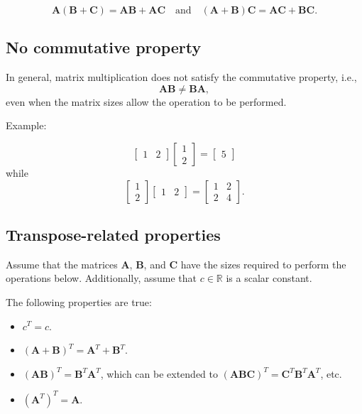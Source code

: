 \documentclass[
]{book}
\providecommand{\tightlist}{%
  \setlength{\itemsep}{0pt}\setlength{\parskip}{0pt}}
\theoremstyle{definition}
\theoremstyle{definition}
\theoremstyle{definition}
\theoremstyle{definition}
\theoremstyle{remark}
\begin{document}
\[\mathbf{A}(\mathbf{B}+\mathbf{C})=\mathbf{AB} + \mathbf{AC}\quad\mathrm{and}\quad (\mathbf{A}+\mathbf{B})\mathbf{C} = \mathbf{AC} + \mathbf{BC}.\]

\hypertarget{no-commutative-property}{%
\subsection{No commutative property}\label{no-commutative-property}}

In general, matrix multiplication does not satisfy the commutative property, i.e.,
\[\mathbf{AB} \neq \mathbf{BA},\] even when the matrix sizes allow the operation to be performed.

Example:

\[
\begin{bmatrix}
1 & 2
\end{bmatrix}
\begin{bmatrix}
1\\
2
\end{bmatrix}
=
\begin{bmatrix}
5
\end{bmatrix}
\]
while
\[
\begin{bmatrix}
1\\
2
\end{bmatrix}
\begin{bmatrix}
1 & 2
\end{bmatrix}
=
\begin{bmatrix}
1 & 2\\
2 & 4
\end{bmatrix}.
\]

\hypertarget{transpose-related-properties}{%
\subsection{Transpose-related properties}\label{transpose-related-properties}}

Assume that the matrices \(\mathbf{A}\), \(\mathbf{B}\), and \(\mathbf{C}\) have the sizes required to perform the operations below. Additionally, assume that \(c\in \mathbb{R}\) is a scalar constant.

The following properties are true:

\begin{itemize}
\tightlist
\item
  \(c^T = c\).
\item
  \((\mathbf{A} + \mathbf{B})^T = \mathbf{A}^T + \mathbf{B}^T\).
\item
  \((\mathbf{AB})^T = \mathbf{B}^T \mathbf{A}^T\), which can be extended to \((\mathbf{ABC})^T=\mathbf{C}^T \mathbf{B}^T \mathbf{A}^T\), etc.
\item
  \((\mathbf{A}^T)^T=\mathbf{A}\).
\end{itemize}
\end{document}
